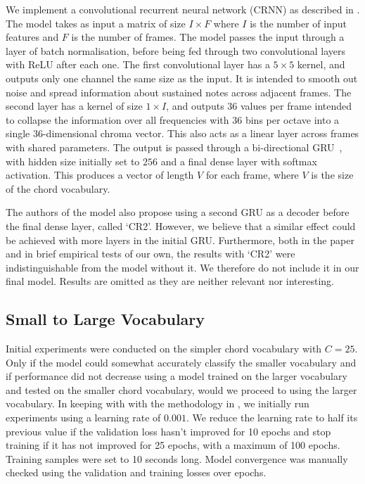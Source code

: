 We implement a convolutional recurrent neural network (CRNN) as described in \citet{StructuredTraining}. The model takes as input a matrix of size $I \times F$ where $I$ is the number of input features and $F$ is the number of frames. The model passes the input through a layer of batch normalisation, before being fed through two convolutional layers with ReLU after each one. The first convolutional layer has a $5\times 5$ kernel, and outputs only one channel the same size as the input. It is intended to smooth out noise and spread information about sustained notes across adjacent frames. The second layer has a kernel of size $1\times I$, and outputs 36 values per frame intended to collapse the information over all frequencies with 36 bins per octave into a single 36-dimensional chroma vector. This also acts as a linear layer across frames with shared parameters. The output is passed through a bi-directional GRU~\citep{GRU}, with hidden size initially set to $256$ and a final dense layer with softmax activation. This produces a vector of length $V$ for each frame, where $V$ is the size of the chord vocabulary.

The authors of the model also propose using a second GRU as a decoder before the final dense layer, called `CR2'. However, we believe that a similar effect could be achieved with more layers in the initial GRU. Furthermore, both in the paper and in brief empirical tests of our own, the results with `CR2' were indistinguishable from the model without it. We therefore do not include it in our final model. Results are omitted as they are neither relevant nor interesting.

\subsection{Small to Large Vocabulary}

Initial experiments were conducted on the simpler chord vocabulary with $C=25$. Only if the model could somewhat accurately classify the smaller vocabulary and if performance did not decrease using a model trained on the larger vocabulary and tested on the smaller chord vocabulary, would we proceed to using the larger vocabulary. In keeping with with the methodology in \citet{StructuredTraining}, we initially run experiments using a learning rate of $0.001$. We reduce the learning rate to half its previous value if the validation loss hasn't improved for 10 epochs and stop training if it has not improved for 25 epochs, with a maximum of 100 epochs. Training samples were set to 10 seconds long. Model convergence was manually checked using the validation and training losses over epochs.

